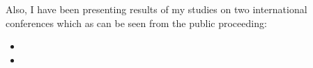 \begin{preface}
Also, I have been presenting results of my studies on two international conferences which as can be seen from the public proceeding:
\begin{itemize}
 \item {}
 \item {}
\end{itemize}








% 
% 
% 
% 


\end{preface}
